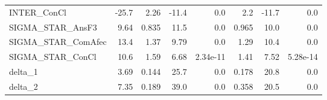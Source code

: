 \begin{tabular}{lrrrrrrr}
INTER\_ConCl        &   -25.7 &     2.26 &   -11.4 &      0.0 &           2.2 &        -11.7 &           0.0 \\
SIGMA\_STAR\_AnsF3   &    9.64 &    0.835 &    11.5 &      0.0 &         0.965 &         10.0 &           0.0 \\
SIGMA\_STAR\_ComAfec &    13.4 &     1.37 &    9.79 &      0.0 &          1.29 &         10.4 &           0.0 \\
SIGMA\_STAR\_ConCl   &    10.6 &     1.59 &    6.68 & 2.34e-11 &          1.41 &         7.52 &      5.28e-14 \\
delta\_1            &    3.69 &    0.144 &    25.7 &      0.0 &         0.178 &         20.8 &           0.0 \\
delta\_2            &    7.35 &    0.189 &    39.0 &      0.0 &         0.358 &         20.5 &           0.0 \\
\bottomrule
\end{tabular}

